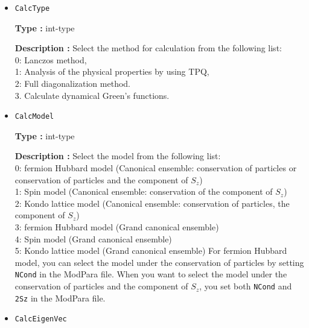 \begin{itemize}
\item  \verb|CalcType|

{\bf Type :} int-type 

{\bf Description :} Select the method for calculation from the following list:\\
0: Lanczos method,\\
1: Analysis of the physical properties by using TPQ,\\
2: Full diagonalization method.\\
{
3. Calculate dynamical Green's functions.
}

\item  \verb|CalcModel|

{\bf Type :} int-type 

{\bf Description :} Select the model from the following list:\\
0: fermion Hubbard model (Canonical ensemble: {conservation of particles or} conservation of particles and the component of $S_z$)\\
1: Spin model (Canonical ensemble: conservation of the component of $S_z$)\\
2: Kondo lattice model (Canonical ensemble: conservation of particles, the component of $S_z$)\\
3: fermion Hubbard model (Grand canonical ensemble)\\
4: Spin model (Grand canonical ensemble)\\
5: Kondo lattice model (Grand canonical ensemble)
{For fermion Hubbard model, you can select the model under the conservation of particles by setting} \verb|NCond| {in the ModPara file. When you want to select the model under the conservation of particles and the component of $S_z$, you set both} \verb|NCond| and \verb|2Sz| {in the ModPara file}.
%
%

\item  \verb|CalcEigenVec|


\end{itemize}
